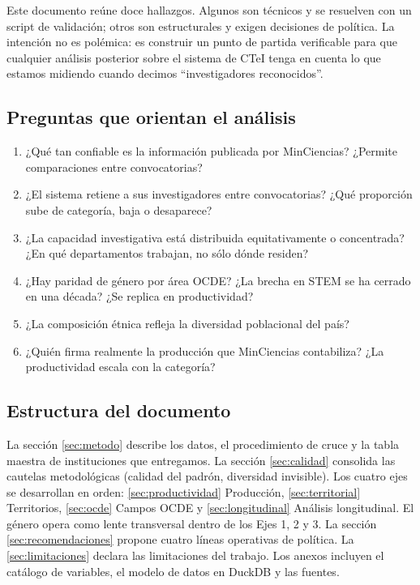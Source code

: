 \documentclass[11pt,a4paper,oneside]{article}
\begin{document}
Este documento reúne doce hallazgos. Algunos son técnicos y se resuelven con un script de validación; otros son estructurales y exigen decisiones de política. La intención no es polémica: es construir un punto de partida verificable para que cualquier análisis posterior sobre el sistema de CTeI tenga en cuenta lo que estamos midiendo cuando decimos ``investigadores reconocidos''.

\subsection{Preguntas que orientan el análisis}

\begin{enumerate}[label=Q\arabic*., leftmargin=*]
\item ¿Qué tan confiable es la información publicada por MinCiencias? ¿Permite comparaciones entre convocatorias?
\item ¿El sistema retiene a sus investigadores entre convocatorias? ¿Qué proporción sube de categoría, baja o desaparece?
\item ¿La capacidad investigativa está distribuida equitativamente o concentrada? ¿En qué departamentos trabajan, no sólo dónde residen?
\item ¿Hay paridad de género por área OCDE? ¿La brecha en STEM se ha cerrado en una década? ¿Se replica en productividad?
\item ¿La composición étnica refleja la diversidad poblacional del país?
\item ¿Quién firma realmente la producción que MinCiencias contabiliza? ¿La productividad escala con la categoría?
\end{enumerate}

\subsection{Estructura del documento}

La sección \ref{sec:metodo} describe los datos, el procedimiento de cruce y la tabla maestra de instituciones que entregamos. La sección \ref{sec:calidad} consolida las cautelas metodológicas (calidad del padrón, diversidad invisible). Los cuatro ejes se desarrollan en orden: \ref{sec:productividad} Producción, \ref{sec:territorial} Territorios, \ref{sec:ocde} Campos OCDE y \ref{sec:longitudinal} Análisis longitudinal. El género opera como lente transversal dentro de los Ejes 1, 2 y 3. La sección \ref{sec:recomendaciones} propone cuatro líneas operativas de política. La \ref{sec:limitaciones} declara las limitaciones del trabajo. Los anexos incluyen el catálogo de variables, el modelo de datos en DuckDB y las fuentes.
\end{document}
